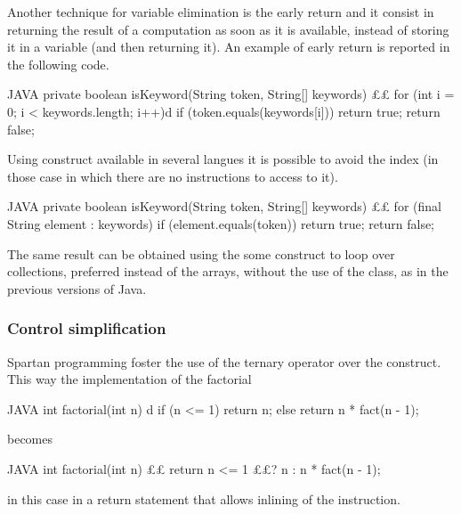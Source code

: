 Another technique for variable elimination is the early return and it consist
in returning the result of a computation as soon as it is available, instead of
storing it in a variable (and then returning it).  An example of early return
is reported in the following code.

\begin{code}{JAVA}
private boolean isKeyword(String token, String[] keywords) {££
    for (int i = 0; i < keywords.length; i++)d
        if (token.equals(keywords[i]))
            return true;
    return false;
}
\end{code}

Using  construct available in several langues it is possible to
avoid the index (in those case in which there are no instructions to access to
it).
\begin{code}{JAVA}
private boolean isKeyword(String token, String[] keywords) {££
    for (final String element : keywords)
        if (element.equals(token))
            return true;
    return false;
}
\end{code}
The same result can be obtained using the some construct to loop over
collections, preferred instead of the arrays, without the use of the
 class, as in the previous versions of Java.


\subsubsection{Control simplification}
Spartan programming foster the use of the ternary operator over the
 construct.  This way the implementation of the factorial
\begin{code}{JAVA}
int factorial(int n) {d
    if (n <= 1)
        return n;
    else
        return n * fact(n - 1);
}
\end{code}
becomes
\begin{code}{JAVA}
int factorial(int n) {££
  return n <= 1 ££? n : n * fact(n - 1);
}
\end{code}
in this case in a return statement that allows inlining of the instruction.

